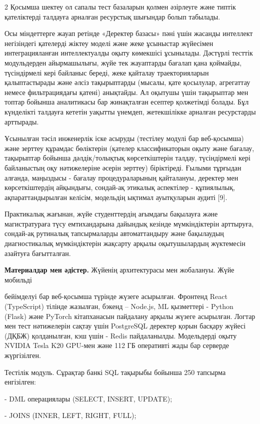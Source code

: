 \begin{multicols}{2}
Қосымша шектеу ол сапалы тест базаларын қолмен әзірлеуге және типтік
қателіктерді талдауға арналған ресурстық шығындар болып табылады.

Осы міндеттерге жауап ретінде «Деректер базасы» пәні үшін жасанды
интеллект негізіндегі қателерді жіктеу моделі және жеке ұсыныстар
жүйесімен интеграцияланған интеллектуалды оқыту көмекшісі ұсынылады.
Дәстүрлі тесттік модульдерден айырмашылығы, жүйе тек жауаптарды бағалап
қана қоймайды, түсіндірмелі кері байланыс береді, жеке қайталау
траекторияларын қалыптастырады және әлсіз тақырыптарды (мысалы, қате
қосылулар, агрегаттау немесе фильтрациядағы қатені) анықтайды. Ал
оқытушы үшін тақырыптар мен топтар бойынша аналитикасы бар жинақталған
есептер қолжетімді болады. Бұл күнделікті талдауға кететін уақытты
үнемдеп, жетекшілікке арналған ресурстарды арттырады.

Ұсынылған тәсіл инженерлік іске асыруды (тестілеу модулі бар
веб‑қосымша) және зерттеу құрамдас бөліктерін (қателер классификаторын
оқыту және бағалау, тақырыптар бойынша дәлдік/толықтық көрсеткіштерін
талдау, түсіндірмелі кері байланыстың оқу нәтижелеріне әсерін зерттеу)
біріктіреді. Ғылыми тұрғыдан алғанда, маңыздысы - бағалау
процедураларының қайталануы, деректер мен көрсеткіштердің айқындығы,
сондай-ақ этикалық аспектілер - құпиялылық, ақпараттандырылған келісім,
модельдің ықтимал ауытқуларын аудиті {[}9{]}.

Практикалық жағынан, жүйе студенттердің ағымдағы бақылауға және
магистратураға түсу емтихандарына дайындық кезінде мүмкіндіктерін
арттыруға, сондай-ақ рутиналық тапсырмаларды автоматтандыру және
бақылаудың диагностикалық мүмкіндіктерін жақсарту арқылы оқытушылардың
жүктемесін азайтуға бағытталған.

{\bfseries Материалдар мен әдістер.} Жүйенің архитектурасы мен жобалануы.
Жүйе мобильді

бейімделуі бар веб-қосымша түрінде жүзеге асырылған. Фронтенд React
(TypeScript) тілінде жазылған, бэкенд -- Node.js, ML қызметтері - Python
(Flask) және PyTorch кітапханасын пайдалану арқылы жүзеге асырылған.
Логтар мен тест нәтижелерін сақтау үшін PostgreSQL деректер қорын
басқару жүйесі (ДҚБЖ) қолданылған, кэш үшін - Redis пайдаланылды.
Модельдерді оқыту NVIDIA Tesla K20 GPU-мен және 112 ГБ оперативті жады
бар серверде жүргізілген.

Тестілік модуль. Сұрақтар банкі SQL тақырыбы бойынша 250 тапсырма
енгізілген:

- DML операциялары (SELECT, INSERT, UPDATE);

- JOINS (INNER, LEFT, RIGHT, FULL);


\end{multicols}
